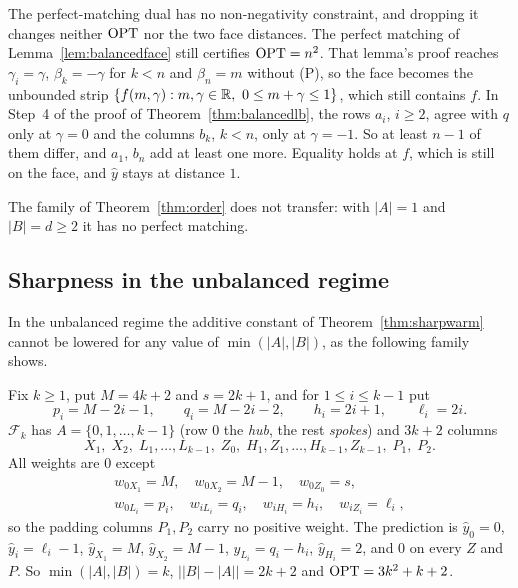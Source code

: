 The perfect-matching dual has no non-negativity constraint, and dropping it changes neither $\mathrm{OPT}$
nor the two face distances. The perfect matching of Lemma~\ref{lem:balancedface} still certifies
$\mathrm{OPT} = n^2$. That lemma's proof reaches $\gamma_i = \gamma$, $\beta_k = -\gamma$ for $k < n$ and
$\beta_n = m$ without (P), so the face becomes the unbounded strip
$\{f(m,\gamma) : m, \gamma \in \mathbb{R},\ 0 \le m + \gamma \le 1\}$, which still contains $f$. In Step~4
of the proof of Theorem~\ref{thm:balancedlb}, the rows $a_i$, $i \ge 2$, agree with $q$ only at
$\gamma = 0$ and the columns $b_k$, $k < n$, only at $\gamma = -1$. So at least $n - 1$ of them
differ, and $a_1$, $b_n$ add at least one more. Equality holds at $f$, which is still on the face,
and $\hat y$ stays at distance $1$.

The family of Theorem~\ref{thm:order} does not transfer: with $|A| = 1$ and $|B| = d \ge 2$ it has
no perfect matching.

\subsection{Sharpness in the unbalanced regime}

In the unbalanced regime the additive constant of Theorem~\ref{thm:sharpwarm} cannot be lowered for
any value of $\min(|A|,|B|)$, as the following family shows.
\begin{definition}\label{def:sharpfam}
Fix $k \ge 1$, put $M = 4k+2$ and $s = 2k+1$, and for $1 \le i \le k-1$ put
\[
  p_i = M - 2i - 1,\qquad q_i = M - 2i - 2,\qquad h_i = 2i+1,\qquad \ell_i = 2i .
\]
$\mathcal{F}_k$ has $A = \{0,1,\dots,k-1\}$ (row $0$ the \emph{hub}, the rest \emph{spokes}) and
$3k+2$ columns
\[
  X_1,\; X_2,\; L_1, \dots, L_{k-1},\; Z_0,\; H_1, Z_1, \dots, H_{k-1}, Z_{k-1},\; P_1,\; P_2 .
\]
All weights are $0$ except
\begin{gather*}
  w_{0X_1} = M,\quad w_{0X_2} = M-1,\quad w_{0Z_0} = s,\\
  w_{0L_i} = p_i,\quad w_{iL_i} = q_i,\quad w_{iH_i} = h_i,\quad w_{iZ_i} = \ell_i ,
\end{gather*}
so the padding columns $P_1, P_2$ carry no positive weight. The prediction is
$\hat y_0 = 0$, $\hat y_i = \ell_i - 1$, $\hat y_{X_1} = M$, $\hat y_{X_2} = M-1$,
$\hat y_{L_i} = q_i - h_i$, $\hat y_{H_i} = 2$, and $0$ on every $Z$ and $P$. So
$\min(|A|,|B|) = k$, $\bigl||B|-|A|\bigr| = 2k+2$ and $\mathrm{OPT} = 3k^2 + k + 2$.
\end{definition}

